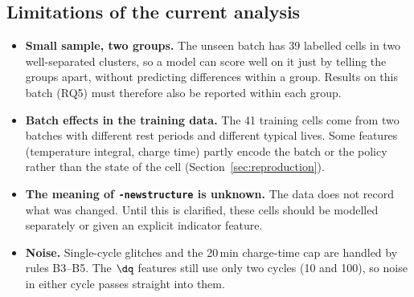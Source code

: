 \subsection{Limitations of the current analysis}
\begin{itemize}
  \item \textbf{Small sample, two groups.} The unseen batch has 39 labelled
  cells in two well-separated clusters, so a model can score well on it just
  by telling the groups apart, without predicting differences within a
  group. Results on this batch (RQ5) must therefore also be reported within
  each group.
  \item \textbf{Batch effects in the training data.} The 41 training cells
  come from two batches with different rest periods and different typical
  lives. Some features (temperature integral, charge time) partly encode the
  batch or the policy rather than the state of the cell
  (Section~\ref{sec:reproduction}).
  \item \textbf{The meaning of \texttt{-newstructure} is unknown.} The data
  does not record what was changed. Until this is clarified, these cells
  should be modelled separately or given an explicit indicator feature.
  \item \textbf{Noise.} Single-cycle glitches and the 20\,min charge-time
  cap are handled by rules B3--B5. The $\dq$ features still use only two
  cycles (10 and 100), so noise in either cycle passes straight into
  them.
\end{itemize}
